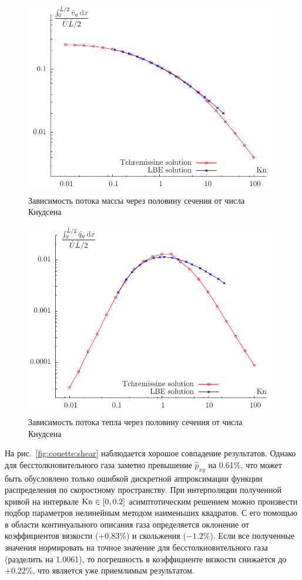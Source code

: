\begin{figure}
	\centering
	\includegraphics{problems/couette_flow.pdf}
	\caption{Зависимость потока массы через половину сечения от числа Кнудсена}\label{fig:couette:flow}
\end{figure}

\begin{figure}
	\centering
	\includegraphics{problems/couette_qflow.pdf}
	\caption{Зависимость потока тепла через половину сечения от числа Кнудсена}\label{fig:couette:qflow}
\end{figure}

На рис.~\ref{fig:couette:shear} наблюдается хорошое совпадение результатов.
Однако для бесстолкновительного газа заметно превышение \(\hat{p}_{xy}\) на 0.61\%,
что может быть обусловлено только ошибкой дискретной аппроксимации функции распределения по скоростному пространству.
При интерполяции полученной кривой на интервале \(\mathrm{Kn}\in[0,0.2]\) асимптотическим решением 
можно произвести подбор параметров нелинейным методом наименьших квадратов.
С его помощью в области континуального описания газа определяется оклонение 
от коэффициентов вязкости (\(+0.83\%\)) и скольжения (\(-1.2\%\)).
Если все полученные значения нормировать на точное значение для бесстолкновительного газа (разделить на 1.0061),
то погрешность в коэффициенте вязкости снижается до \(+0.22\%\), что является уже приемлимым результатом.

